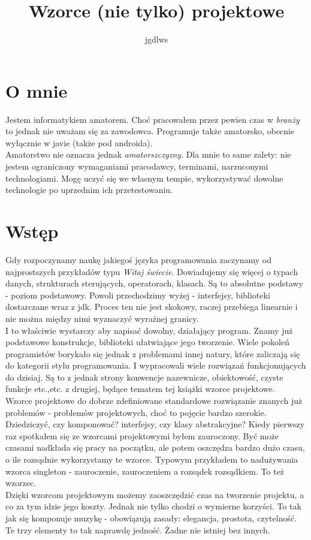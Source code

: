 \documentclass[12pt,a4paper]{article}
\author{jgdlws}
\title{Wzorce (nie tylko) projektowe}
\begin{document}
	\part*{O mnie}
	
	Jestem informatykiem amatorem. Choć pracowałem przez pewien czas w \emph{branży} to jednak nie uważam się za zawodowca. Programuje także amatorsko, obecnie wyłącznie w javie (także pod androida). \\
	Amatorstwo nie oznacza jednak \emph{amatorszczyzny}. Dla mnie to same zalety: nie jestem ograniczony wymaganiami pracodawcy, terminami, narzuconymi technologiami. Mogę uczyć się we własnym tempie, wykorzystywać dowolne technologie po uprzednim ich przetestowaniu.
	\part*{Wstęp}
	Gdy rozpoczynamy naukę jakiegoś języka programowania zaczynamy od najprostszych przykładów typu \emph{Witaj świecie}. Dowiadujemy się więcej o typach danych, strukturach sterujących, operatorach, klasach. Są to absolutne podstawy - poziom podstawowy. Powoli przechodzimy wyżej - interfejsy, biblioteki dostarczane wraz z jdk. Proces ten nie jest skokowy, raczej przebiega linearnie i nie można między nimi wyznaczyć wyraźnej granicy.\\
	I to właściwie wystarczy aby napisać dowolny, działający program. Znamy już podstawowe konstrukcje, biblioteki ułatwiające jego tworzenie. Wiele pokoleń programistów borykało się jednak z problemami innej natury, które zaliczają się do kategorii stylu programowania. I wypracowali  wiele rozwiązań funkcjonujących do dzisiaj. Są to z jednak strony konwencje nazewnicze, obiektowość, czyste funkcje etc.,etc. z drugiej, będące tematem tej książki wzorce projektowe. \\
	Wzorce projektowe do dobrze zdefiniowane standardowe rozwiązanie  znanych już problemów - problemów projektowych, choć to pojęcie bardzo szerokie. Dziedziczyć, czy komponować? interfejsy, czy klasy abstrakcyjne? Kiedy pierwszy raz spotkałem się ze wzorcami projektowymi byłem zauroczony. Być może czasami nadkłada się pracy na początku, ale potem oszczędza bardzo dużo czasu, o ile rozsądnie wykorzystamy te wzorce. Typowym przykładem to nadużywania wzorca singleton - zauroczenie, zauroczeniem a rozsądek rozsądkiem. To też wzorzec.\\
	Dzięki wzorcom projektowym możemy zaoszczędzić czas na tworzenie projektu, a co za tym idzie jego koszty. Jednak nie tylko chodzi o wymierne korzyści. To tak jak się komponuje muzykę - obowiązują zasady: elegancja, prostota, czytelność. Te trzy elementy to tak naprawdę jedność. Żadne nie istniej bez innych.\\
\end{document}
